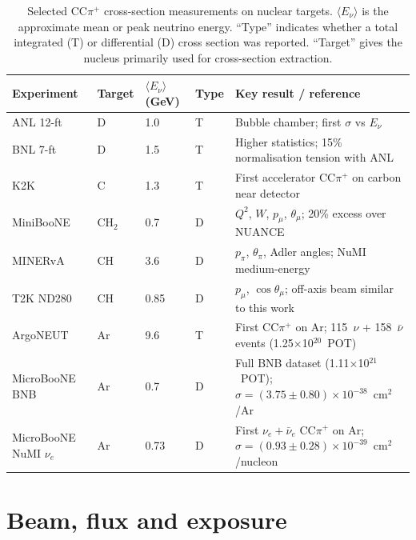\documentclass[11pt,a4paper]{article}
\newcommand{\uboone}{MicroBooNE}
\begin{document}
\begin{table}[H]
  \centering
  \caption{Selected CC$\pi^+$ cross-section measurements on nuclear targets.
    $\langle E_\nu\rangle$ is the approximate mean or peak neutrino energy.
    ``Type'' indicates whether a total integrated (T) or differential (D)
    cross section was reported.  ``Target'' gives the nucleus primarily used for
    cross-section extraction.}
  \label{tab:prev_meas}
  \small
  \begin{tabular}{L{2.6cm} L{1.4cm} C{1.4cm} C{0.8cm} L{4.8cm}}
    \toprule
    Experiment & Target & $\langle E_\nu\rangle$ (GeV) & Type & Key result / reference \\
    \midrule
    ANL 12-ft~\cite{anl_radecky1982}     & D         & 1.0   & T & Bubble chamber; first $\sigma$ vs $E_\nu$ \\
    BNL 7-ft~\cite{bnl_kitagaki1986}     & D         & 1.5   & T & Higher statistics; 15\% normalisation tension with ANL \\
    K2K~\cite{k2k_rodriguez2008}         & C         & 1.3   & T & First accelerator CC$\pi^+$ on carbon near detector \\
    MiniBooNE~\cite{miniboone_ccpi}      & CH$_2$    & 0.7   & D & $Q^2$, $W$, $p_\mu$, $\theta_\mu$; 20\% excess over NUANCE \\
    MINERvA~\cite{minerva_ccpi}          & CH        & 3.6   & D & $p_\pi$, $\theta_\pi$, Adler angles; NuMI medium-energy \\
    T2K ND280~\cite{t2k_ccpip}          & CH        & 0.85  & D & $p_\mu$, $\cos\theta_\mu$; off-axis beam similar to this work \\
    ArgoNEUT~\cite{argoneut_ccpi}        & Ar        & 9.6   & T & First CC$\pi^+$ on Ar; 115~$\nu$ + 158~$\bar\nu$ events (1.25$\times$10$^{20}$~POT) \\
    \uboone{} BNB~\cite{uboone_bnb2026_ccpi}       & Ar        & 0.7   & D & Full BNB dataset (1.11$\times$10$^{21}$~POT); $\sigma=(3.75\pm0.80)\times10^{-38}$~cm$^2$/Ar \\
    \uboone{} NuMI $\nu_e$~\cite{uboone_nue_ccpi} & Ar & 0.73 & D & First $\nu_e+\bar\nu_e$ CC$\pi^+$ on Ar; $\sigma=(0.93\pm0.28)\times10^{-39}$~cm$^2$/nucleon \\
    \bottomrule
  \end{tabular}
\end{table}


\section{Beam, flux and exposure}
\label{sec:flux}
\end{document}
